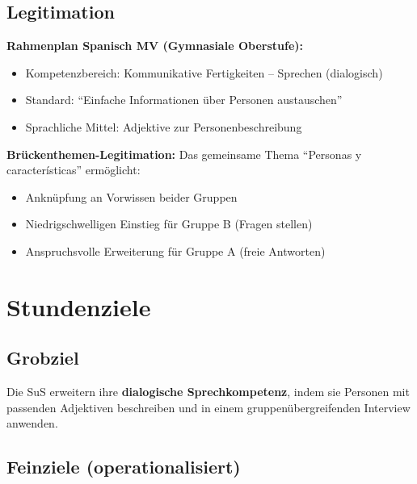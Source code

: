 \documentclass[11pt,a4paper]{article}
\begin{document}
\subsection{Legitimation}

\textbf{Rahmenplan Spanisch MV (Gymnasiale Oberstufe):}
\begin{itemize}
    \item Kompetenzbereich: Kommunikative Fertigkeiten -- Sprechen (dialogisch)
    \item Standard: ``Einfache Informationen über Personen austauschen''
    \item Sprachliche Mittel: Adjektive zur Personenbeschreibung
\end{itemize}

\textbf{Brückenthemen-Legitimation:}
Das gemeinsame Thema ``Personas y características'' ermöglicht:
\begin{itemize}
    \item Anknüpfung an Vorwissen beider Gruppen
    \item Niedrigschwelligen Einstieg für Gruppe B (Fragen stellen)
    \item Anspruchsvolle Erweiterung für Gruppe A (freie Antworten)
\end{itemize}

\section{Stundenziele}

\subsection{Grobziel}
Die SuS erweitern ihre \textbf{dialogische Sprechkompetenz}, indem sie Personen mit passenden Adjektiven beschreiben und in einem gruppenübergreifenden Interview anwenden.

\subsection{Feinziele (operationalisiert)}
\end{document}

